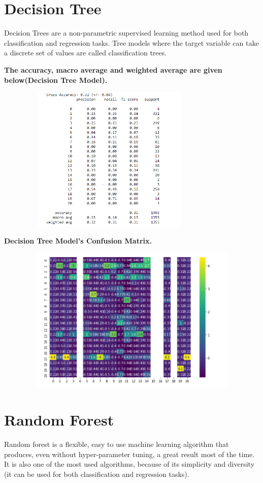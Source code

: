 \documentclass[11pt]{article}
\begin{document}
\section{Decision Tree}
Decision Trees are a non-parametric supervised learning method used for both classification and regression tasks. Tree models where the target variable can take a discrete set of values are called classification trees.

\begin{center}
\bf The accuracy, macro average and weighted average are given below(Decision Tree Model).
\end{center}

\includegraphics[width=11cm, height=7cm]{DecisionTreeModel}

\begin{center}
\bf Decision Tree Model's Confusion Matrix.
\end{center}

\includegraphics[width=16cm, height=7cm]{DecisionTreeMatrix}


\section{Random Forest}
Random forest is a flexible, easy to use machine learning algorithm that produces, even without hyper-parameter tuning, a great result most of the time. It is also one of the most used algorithms, because of its simplicity and diversity (it can be used for both classification and regression tasks).
\end{document}
